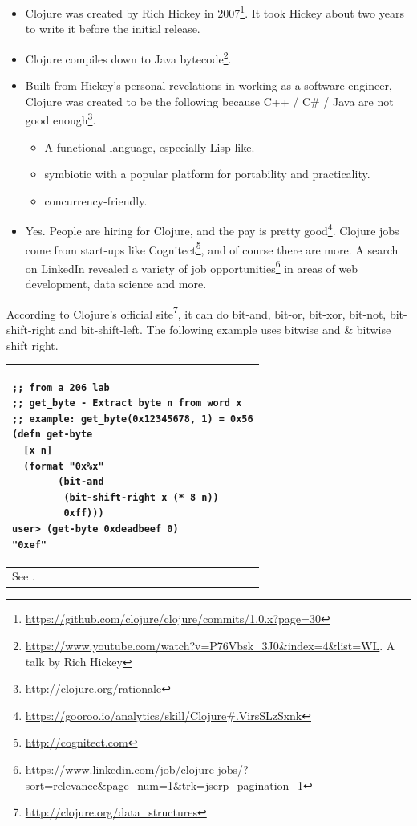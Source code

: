 \documentclass[12pt]{article}
\begin{document}
\begin{itemize}
\item Clojure was created by Rich Hickey in 2007\footnote{\url{https://github.com/clojure/clojure/commits/1.0.x?page=30}}. It took Hickey about two years to write it before the initial release.
\item Clojure compiles down to Java bytecode\footnote{\url{https://www.youtube.com/watch?v=P76Vbsk_3J0&index=4&list=WL}. A talk by Rich Hickey}.
\item Built from Hickey's personal revelations in working as a software engineer, Clojure was created to be the following because C++ / C\# / Java are not good enough\footnote{\url{http://clojure.org/rationale}}.
\begin{itemize}
\item A functional language, especially Lisp-like.
\item symbiotic with a popular platform for portability and practicality.
\item concurrency-friendly.
\end{itemize}
\item Yes. People are hiring for Clojure, and the pay is pretty good\footnote{\url{https://gooroo.io/analytics/skill/Clojure\#.VirsSLzSxnk}}. Clojure jobs come from start-ups like Cognitect\footnote{\url{http://cognitect.com}}, and of course there are more. A search on LinkedIn revealed a variety of job opportunities\footnote{\url{https://www.linkedin.com/job/clojure-jobs/?sort=relevance\&page_num=1\&trk=jserp_pagination_1}} in areas of web development, data science and more. 
\end{itemize}




According to Clojure's official site\footnote{\url{http://clojure.org/data_structures}}, it can do bit-and, bit-or, bit-xor, bit-not, bit-shift-right and bit-shift-left. The following example uses bitwise and \& bitwise shift right.

\begin{tabular}{|p{}|}
\hline
\begin{verbatim}
;; from a 206 lab
;; get_byte - Extract byte n from word x
;; example: get_byte(0x12345678, 1) = 0x56
(defn get-byte
  [x n]
  (format "0x%x" 
        (bit-and 
         (bit-shift-right x (* 8 n)) 
         0xff)))
user> (get-byte 0xdeadbeef 0)
"0xef"
\end{verbatim}
\\
\hline
See \cite{empty}.
\\
\hline
\end{tabular}
\end{document}
